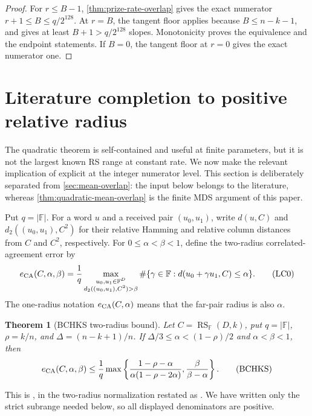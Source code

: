 \documentclass[11pt,a4paper]{amsart}
\numberwithin{equation}{section}
\newtheorem{theorem}{Theorem}[section]
\theoremstyle{remark}
\DeclareMathOperator{\RS}{RS}
\newcommand{\F}{\mathbb F}
\newcommand{\abs}[1]{\lvert #1\rvert}
\begin{document}
\begin{proof}
For \(r\le B-1\), \cref{thm:prize-rate-overlap} gives the exact
numerator \(r+1\le B\le q/2^{128}\).  At \(r=B\), the tangent floor
applies because \(B\le n-k-1\), and gives at least
\(B+1>q/2^{128}\) slopes.  Monotonicity proves the
equivalence and the endpoint statements.  If \(B=0\), the tangent floor
at \(r=0\) gives the exact numerator one.
\end{proof}


\section{Literature completion to positive relative radius}
\label{sec:literature-completion}

The quadratic theorem is self-contained and useful at finite parameters,
but it is not the largest known RS range at constant rate.  We now make
the relevant implication of \cite{BCHKS25} explicit at the integer
numerator level.  This section is deliberately separated from
\cref{sec:mean-overlap}: the input below belongs to the literature,
whereas \cref{thm:quadratic-mean-overlap} is the finite MDS argument of
this paper.

Put \(q=\abs\F\).  For a word \(u\) and a received pair \((u_0,u_1)\), write
\(d(u,C)\) and \(d_2((u_0,u_1),C^2)\) for their relative Hamming and
relative column distances from \(C\) and \(C^2\), respectively.  For
\(0\le\alpha<\beta<1\), define the two-radius correlated-agreement error
by
\[
 e_{\rm CA}(C,\alpha,\beta)
 =\frac1q\max_{\substack{u_0,u_1\in\F^D\\
                  d_2((u_0,u_1),C^2)>\beta}}
   \#\{\gamma\in\F:d(u_0+\gamma u_1,C)\le\alpha\}.       \tag{LC0}
 \label{eq:two-radius-ca}
\]
The one-radius notation \(e_{\rm CA}(C,\alpha)\) means that the far-pair
radius is also \(\alpha\).

\begin{theorem}[BCHKS two-radius bound]
\label{thm:bchks-two-radius}
Let \(C=\RS_\F(D,k)\), put \(q=\abs\F\),
\(\rho=k/n\), and \(\Delta=(n-k+1)/n\).  If
\(\Delta/3\le\alpha<(1-\rho)/2\) and
\(\alpha<\beta<1\), then
\[
 e_{\rm CA}(C,\alpha,\beta)
 \le \frac1q\max\left\{
   \frac{1-\rho-\alpha}{\alpha(1-\rho-2\alpha)},
   \frac{\beta}{\beta-\alpha}
                         \right\}.              \tag{BCHKS}
 \label{eq:bchks-two-radius}
\]
\end{theorem}

This is \cite[Thm.~1.3]{BCHKS25}, in the two-radius normalization
restated as \cite[Thm.~4.9\textup{(2)}]{ABF26}.  We have written only
the strict subrange needed below, so all displayed denominators are
positive.
\end{document}
